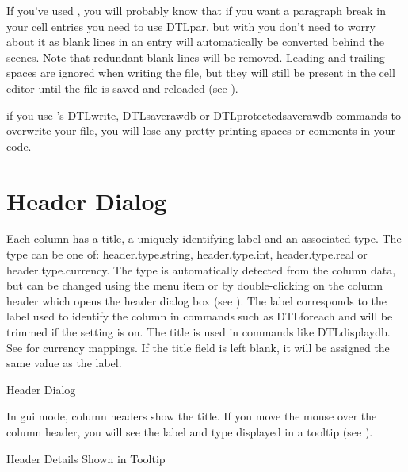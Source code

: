 If you've used , you will probably know that 
if you want a paragraph break in your cell entries you need to use 
\gls{DTLpar}, but with  you don't need to worry about it 
as blank lines in an entry will automatically be converted behind 
the scenes. Note that redundant blank lines will be removed. Leading
and trailing spaces are ignored when writing the  file,
but they will still be present in the cell editor until the file is
saved and reloaded (see ).

 if you use 's \gls{DTLwrite},
\gls{DTLsaverawdb} or \gls{DTLprotectedsaverawdb} commands to
overwrite your file, you will lose any pretty-printing spaces or
comments in your code.

\section{Header Dialog}\label{sec:editheader}

Each column has a title, a uniquely identifying label
and an associated type. The type can be one of:
\gls{header.type.string}, 
\gls{header.type.int}, 
\gls{header.type.real} or 
\gls{header.type.currency}.
The type is automatically detected from the column data,
but can be changed using the 
menu item or by double-clicking on the column header which opens the 
header dialog box (see ). The label corresponds 
to the label used to identify the column in commands such
as \gls{DTLforeach} and will be trimmed if the 
 setting is on. The title is used in 
commands like \gls{DTLdisplaydb}. See  for 
currency mappings. If the title field is left blank, it will be assigned 
the same value as the label.

 {%
 }
 {Header Dialog}

In \gls{gui} mode, column headers show the
title. If you move the mouse over the column header, you will see the
label and type displayed in a tooltip (see 
).

 {%
 }
 {Header Details Shown in Tooltip}

